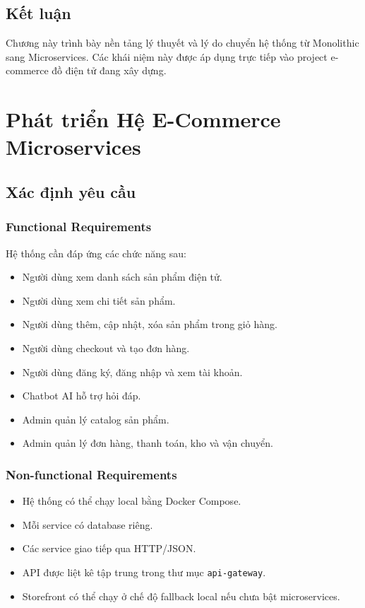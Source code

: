 \documentclass[12pt,a4paper]{report}
\begin{document}
\section{Kết luận}

Chương này trình bày nền tảng lý thuyết và lý do chuyển hệ thống từ Monolithic sang Microservices. Các khái niệm này được áp dụng trực tiếp vào project e-commerce đồ điện tử đang xây dựng.

\clearpage

\chapter{Phát triển Hệ E-Commerce Microservices}

\section{Xác định yêu cầu}

\subsection{Functional Requirements}

Hệ thống cần đáp ứng các chức năng sau:

\begin{itemize}
  \item Người dùng xem danh sách sản phẩm điện tử.
  \item Người dùng xem chi tiết sản phẩm.
  \item Người dùng thêm, cập nhật, xóa sản phẩm trong giỏ hàng.
  \item Người dùng checkout và tạo đơn hàng.
  \item Người dùng đăng ký, đăng nhập và xem tài khoản.
  \item Chatbot AI hỗ trợ hỏi đáp.
  \item Admin quản lý catalog sản phẩm.
  \item Admin quản lý đơn hàng, thanh toán, kho và vận chuyển.
\end{itemize}

\subsection{Non-functional Requirements}

\begin{itemize}
  \item Hệ thống có thể chạy local bằng Docker Compose.
  \item Mỗi service có database riêng.
  \item Các service giao tiếp qua HTTP/JSON.
  \item API được liệt kê tập trung trong thư mục \texttt{api-gateway}.
  \item Storefront có thể chạy ở chế độ fallback local nếu chưa bật microservices.
\end{itemize}
\end{document}
